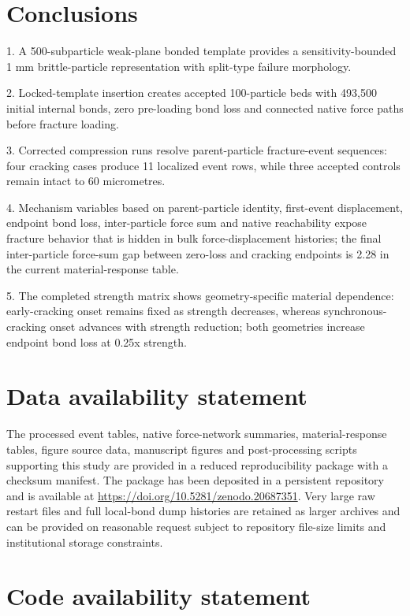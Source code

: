\documentclass[preprint,12pt]{elsarticle}
\begin{document}
\section{Conclusions}

1. A 500-subparticle weak-plane bonded template provides a sensitivity-bounded 1 mm brittle-particle representation with split-type failure morphology.

2. Locked-template insertion creates accepted 100-particle beds with 493,500 initial internal bonds, zero pre-loading bond loss and connected native force paths before fracture loading.

3. Corrected compression runs resolve parent-particle fracture-event sequences: four cracking cases produce 11 localized event rows, while three accepted controls remain intact to 60 micrometres.

4. Mechanism variables based on parent-particle identity, first-event displacement, endpoint bond loss, inter-particle force sum and native reachability expose fracture behavior that is hidden in bulk force-displacement histories; the final inter-particle force-sum gap between zero-loss and cracking endpoints is 2.28 in the current material-response table.

5. The completed strength matrix shows geometry-specific material dependence: early-cracking onset remains fixed as strength decreases, whereas synchronous-cracking onset advances with strength reduction; both geometries increase endpoint bond loss at 0.25x strength.


\section{Data availability statement}

The processed event tables, native force-network summaries, material-response tables, figure source data, manuscript figures and post-processing scripts supporting this study are provided in a reduced reproducibility package with a checksum manifest. The package has been deposited in a persistent repository and is available at \url{https://doi.org/10.5281/zenodo.20687351}. Very large raw restart files and full local-bond dump histories are retained as larger archives and can be provided on reasonable request subject to repository file-size limits and institutional storage constraints.


\section{Code availability statement}
\end{document}
